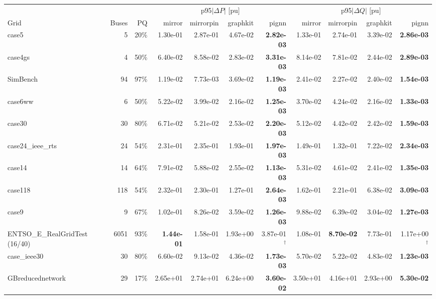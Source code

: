 \documentclass[10pt]{article}
\begin{document}
\begin{landscape}
\begin{table}[H]
\centering\scriptsize
\begin{tabular}{lrr rrrr rrrr}
\toprule
 & & & \multicolumn{4}{c}{p95$|\Delta P|$ [pu]} & \multicolumn{4}{c}{p95$|\Delta Q|$ [pu]} \\
\cmidrule(lr){4-7}\cmidrule(lr){8-11}
Grid & Buses & PQ & mirror & mirrorpin & graphkit & pignn & mirror & mirrorpin & graphkit & pignn \\
\midrule
case5 & 5 & 20\% & 1.30e-01 & 2.87e-01 & 4.67e-02 & \textbf{2.82e-03} & 1.33e-01 & 2.74e-01 & 3.39e-02 & \textbf{2.86e-03} \\
case4gs & 4 & 50\% & 6.40e-02 & 8.58e-02 & 2.83e-02 & \textbf{3.31e-03} & 8.14e-02 & 7.81e-02 & 2.44e-02 & \textbf{2.89e-03} \\
SimBench & 94 & 97\% & 1.19e-02 & 7.73e-03 & 3.69e-02 & \textbf{1.19e-03} & 2.41e-02 & 2.27e-02 & 2.40e-02 & \textbf{1.54e-03} \\
case6ww & 6 & 50\% & 5.22e-02 & 3.99e-02 & 2.16e-02 & \textbf{1.25e-03} & 3.70e-02 & 4.24e-02 & 2.16e-02 & \textbf{1.33e-03} \\
case30 & 30 & 80\% & 6.71e-02 & 5.21e-02 & 2.53e-02 & \textbf{2.20e-03} & 5.12e-02 & 4.42e-02 & 2.42e-02 & \textbf{1.59e-03} \\
case24\_ieee\_rts & 24 & 54\% & 2.31e-01 & 2.35e-01 & 1.93e-01 & \textbf{1.97e-03} & 1.49e-01 & 1.32e-01 & 7.22e-02 & \textbf{2.34e-03} \\
case14 & 14 & 64\% & 7.91e-02 & 5.88e-02 & 2.55e-02 & \textbf{1.13e-03} & 5.31e-02 & 4.61e-02 & 2.41e-02 & \textbf{1.35e-03} \\
case118 & 118 & 54\% & 2.32e-01 & 2.30e-01 & 1.27e-01 & \textbf{2.64e-03} & 1.62e-01 & 2.21e-01 & 6.38e-02 & \textbf{3.09e-03} \\
case9 & 9 & 67\% & 1.02e-01 & 8.26e-02 & 3.59e-02 & \textbf{1.26e-03} & 9.88e-02 & 6.39e-02 & 3.04e-02 & \textbf{1.27e-03} \\
ENTSO\_E\_RealGridTest\,(16/40) & 6051 & 93\% & \textbf{1.44e-01} & 1.58e-01 & 1.93e+00 & 3.87e-01$^\dagger$ & 1.08e-01 & \textbf{8.70e-02} & 7.73e-01 & 1.17e+00$^\dagger$ \\
case\_ieee30 & 30 & 80\% & 6.60e-02 & 9.13e-02 & 4.36e-02 & \textbf{1.73e-03} & 5.70e-02 & 5.22e-02 & 4.83e-02 & \textbf{1.23e-03} \\
GBreducednetwork & 29 & 17\% & 2.65e+01 & 2.74e+01 & 6.24e+00 & \textbf{3.60e-02} & 3.50e+01 & 4.16e+01 & 2.93e+00 & \textbf{5.30e-02} \\

\end{tabular}
\end{table}
\end{landscape}
\end{document}
